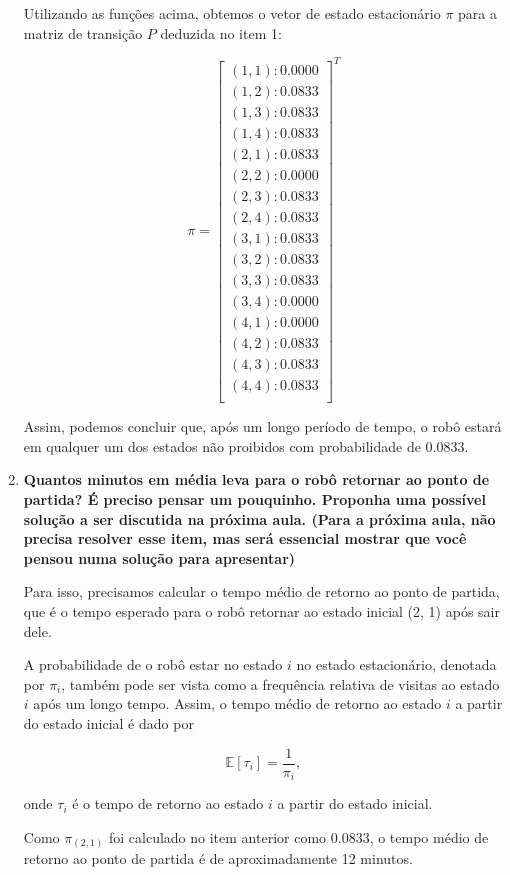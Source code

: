 \begin{enumerate}
Utilizando as funções acima, obtemos o vetor de estado estacionário \( \pi \) para a matriz de transição \( P \) deduzida no item 1:

$$
\pi = \begin{bmatrix}
    (1,1): 0.0000\\
    (1,2): 0.0833\\
    (1,3): 0.0833\\
    (1,4): 0.0833\\
    (2,1): 0.0833\\
    (2,2): 0.0000\\
    (2,3): 0.0833\\
    (2,4): 0.0833\\
    (3,1): 0.0833\\
    (3,2): 0.0833\\
    (3,3): 0.0833\\
    (3,4): 0.0000\\
    (4,1): 0.0000\\
    (4,2): 0.0833\\
    (4,3): 0.0833\\
    (4,4): 0.0833\\
\end{bmatrix}^T
$$

Assim, podemos concluir que, após um longo período de tempo, o robô estará em qualquer um dos estados não proibidos com probabilidade de \( \boldsymbol{0.0833} \).

    \item \textbf{Quantos minutos em média leva para o robô retornar ao ponto de partida? É preciso pensar um pouquinho. Proponha uma possível solução a ser discutida na próxima aula. (Para a próxima aula, não precisa resolver esse item, mas será essencial mostrar que você pensou numa solução para apresentar)}
    
    Para isso, precisamos calcular o tempo médio de retorno ao ponto de partida, que é o tempo esperado para o robô retornar ao estado inicial (2, 1) após sair dele.

    A probabilidade de o robô estar no estado \( i \) no estado estacionário, denotada por \( \pi_i \), também pode ser vista como a frequência relativa de visitas ao estado \( i \) após um longo tempo. Assim, o tempo médio de retorno ao estado \( i \) a partir do estado inicial é dado por
    
    $$ \mathbb{E}[\tau_i] = \frac{1}{\pi_i}, $$

    onde \( \tau_i \) é o tempo de retorno ao estado \( i \) a partir do estado inicial.

    Como $\pi_{(2,1)}$ foi calculado no item anterior como $0.0833$, o tempo médio de retorno ao ponto de partida é de aproximadamente 12 minutos.

\end{enumerate}
